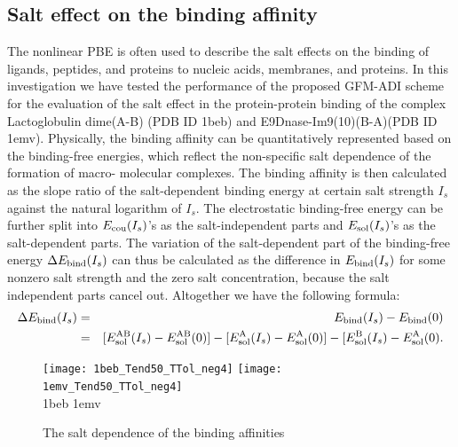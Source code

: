 \subsection{Salt effect on the binding affinity}
The nonlinear PBE is often used to describe the salt effects on the binding of ligands, peptides, and proteins to nucleic acids, membranes, and proteins. In this investigation we have tested the performance of the proposed GFM-ADI scheme for the evaluation of the salt effect in the protein-protein binding of the complex Lactoglobulin dime(A-B) (PDB ID 1beb) and E9Dnase-Im9(10)(B-A)(PDB ID 1emv). Physically, the binding affinity can be quantitatively represented based on the binding-free energies, which reflect the non-specific salt dependence of the formation of macro- molecular complexes. The binding affinity is then calculated as the slope ratio of the salt-dependent binding energy at certain salt strength $I_s$ against the natural logarithm of $I_s$.
The electrostatic binding-free energy can be further split into $E_{\rm cou}(I_s)$'s as the salt-independent parts and $E_{\rm sol}(I_s)$'s as the salt-dependent parts. The variation of the salt-dependent part of the binding-free energy $\Delta E_{\rm bind}(I_s)$ can thus be calculated as the difference in $E_{\rm bind}(I_s)$ for some nonzero salt strength and the zero salt concentration, because the salt independent parts cancel out. Altogether we have the following formula:\\
\begin{eqnarray}
	\Delta E_{\rm bind}(I_s) &=& E_{\rm bind}(I_s)- E_{\rm bind}(0)\label{eq_del_e_bind} \nonumber\\
						 &=& [E_{\rm sol}^{\rm AB}(I_s)-E_{\rm sol}^{\rm AB}(0)]-[E_{\rm sol}^{\rm A}(I_s)-E_{\rm sol}^{\rm A}(0)]- [E_{\rm sol}^{\rm B}(I_s)-E_{\rm sol}^{\rm A}(0).
\end{eqnarray}
						 
\begin{figure}[!ht]
\begin{center}
\texttt{[image: 1beb\_Tend50\_TTol\_neg4]}
\texttt{[image: 1emv\_Tend50\_TTol\_neg4]}
\\
1beb \hskip 2.7in 1emv
\end{center}
\caption{The salt dependence of the binding affinities}
\label{fig_salt_effect}
\end{figure}

